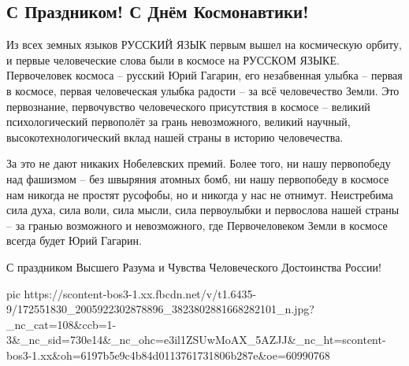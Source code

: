  
 
 
 
 

\subsection{С Праздником! С Днём Космонавтики!}
\label{sec:13_04_2021.fb.morits_junna.1.gagarin_jazyk_kosmos}

Из всех земных языков РУССКИЙ ЯЗЫК первым вышел на космическую орбиту, и первые
человеческие слова были в космосе на РУССКОМ ЯЗЫКЕ. Первочеловек космоса –
русский Юрий Гагарин, его незабвенная улыбка – первая в космосе, первая
человеческая улыбка радости – за всё человечество Земли. Это первознание,
первочувство человеческого присутствия в космосе – великий психологический
первополёт за грань невозможного, великий научный, высокотехнологический вклад
нашей страны в историю человечества.

За это не дают никаких Нобелевских премий. Более того, ни нашу первопобеду над
фашизмом – без швыряния атомных бомб, ни нашу первопобеду в космосе нам никогда
не простят русофобы, но и никогда у нас не отнимут. Неистребима сила духа, сила
воли, сила мысли, сила первоулыбки и первослова нашей страны – за гранью
возможного и невозможного, где Первочеловеком Земли в космосе всегда будет Юрий
Гагарин.

С праздником Высшего Разума и Чувства Человеческого Достоинства России!

\ifcmt
  pic https://scontent-bos3-1.xx.fbcdn.net/v/t1.6435-9/172551830_2005922302878896_3823802881668282101_n.jpg?_nc_cat=108&ccb=1-3&_nc_sid=730e14&_nc_ohc=e3il1ZSUwMoAX_5AZJJ&_nc_ht=scontent-bos3-1.xx&oh=6197b5e9c4b84d0113761731806b287e&oe=60990768
\fi

